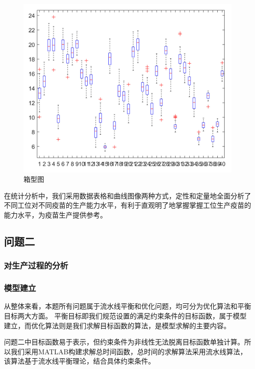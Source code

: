 \documentclass[UTF8]{ctexart}
\begin{document}
	\begin{figure}[H]
		\centering %
		\includegraphics[scale=0.5]{2_xiangxing.jpg}
		\caption{箱型图}
	\end{figure}
	在统计分析中，我们采用数据表格和曲线图像两种方式，定性和定量地全面分析了不同工位对不同疫苗的生产能力水平，有利于直观明了地掌握掌握工位生产疫苗的能力水平，为疫苗生产提供参考。
	
	\subsection{问题二}
	\subsubsection{对生产过程的分析}
	\subsubsection{模型建立}
	从整体来看，本题所有问题属于流水线平衡和优化问题，均可分为优化算法和平衡目标两大方面。%
	平衡目标即我们规范设置的满足约束条件的目标函数，属于模型建立，而优化算法则是我们求解目标函数的算法，是模型求解的主要内容。
		
	问题二中目标函数易于表示，但约束条件为非线性无法脱离目标函数单独计算。所以我们采用MATLAB构建求解总时间函数，总时间的求解算法采用流水线算法，该算法基于流水线平衡理论，结合具体约束条件。
	
\end{document}
